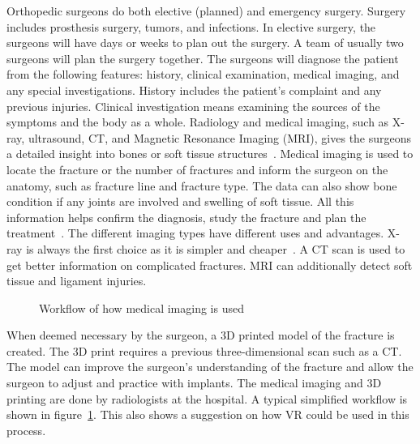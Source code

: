 \documentclass[a4paper]{report}
\begin{document}
Orthopedic surgeons do both elective (planned) and emergency surgery. Surgery includes prosthesis surgery, tumors, and infections.
In elective surgery, the surgeons will have days or weeks to plan out the surgery. A team of usually two surgeons will plan the surgery together.
The surgeons will diagnose the patient from the following features: history, clinical examination, medical imaging, and any special investigations. History includes the patient's complaint and any previous injuries. Clinical investigation means examining the sources of the symptoms and the body as a whole. Radiology and medical imaging, such as X-ray, ultrasound, CT, and Magnetic Resonance Imaging (MRI), gives the surgeons a detailed insight into bones or soft tissue structures~\cite{swiontkowski_manual_2013}.
Medical imaging is used to locate the fracture or the number of fractures and inform the surgeon on the anatomy, such as fracture line and fracture type.
The data can also show bone condition if any joints are involved and swelling of soft tissue. All this information helps confirm the diagnosis, study the fracture and plan the treatment~\cite{ebnezar_textbook_2016}.
The different imaging types have different uses and advantages.
X-ray is always the first choice as it is simpler and cheaper~\cite{ebnezar_textbook_2016}.
A CT scan is used to get better information on complicated fractures. MRI can additionally detect soft tissue and ligament injuries.

\begin{figure}[h!]
    \centering
	\hfill
  \caption{Workflow of how medical imaging is used}
  \label{arbeidsflyt}
  \small
\end{figure}

When deemed necessary by the surgeon, a 3D printed model of the fracture is created. The 3D print requires a previous three-dimensional scan such as a CT. The model can improve the surgeon's understanding of the fracture and allow the surgeon to adjust and practice with implants. The medical imaging and 3D printing are done by radiologists at the hospital.
A typical simplified workflow is shown in figure~\ref{arbeidsflyt}. This also shows a suggestion on how VR could be used in this process.
\end{document}
